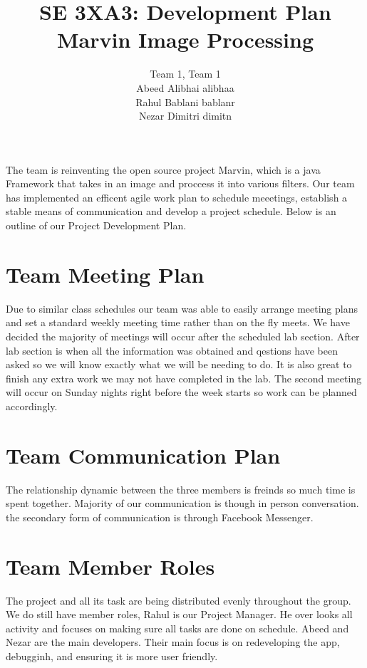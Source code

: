 \documentclass{article}
\begin{document}
\title{SE 3XA3: Development Plan \\ Marvin Image Processing}
\maketitle
\begin{center}
\author{Team 1, Team 1\\Abeed Alibhai alibhaa\\Rahul Bablani bablanr\\Nezar Dimitri dimitn}
\end{center}
The team is reinventing the open source project Marvin, which is a java Framework that takes in an image and proccess it into various filters. Our team has implemented an efficent agile work plan to schedule meeetings, establish a stable means of communication and  develop a project schedule. Below is an outline of our Project Development Plan.

\section{Team Meeting Plan}
Due to similar class schedules our team was able to easily arrange meeting plans and set a standard weekly meeting time rather than on the fly meets. We have decided the majority of meetings will occur after the scheduled lab section. After lab section is when all the information was obtained and qestions have been asked so we will know exactly what we will be needing to do. It is also great to finish any extra work we may not have completed in the lab. The second meeting will occur on Sunday nights right before the week starts so work can be planned accordingly.

\section{Team Communication Plan}
The relationship dynamic between the three members is freinds so much time is spent together. Majority of our communication is though in person conversation. the secondary form of communication is through Facebook Messenger.

\section{Team Member Roles}
The project and all its task are being distributed evenly throughout the group. We do still have member roles, Rahul is our Project Manager. He over looks all activity and focuses on making sure all tasks are done on schedule. Abeed and Nezar are the main developers. Their main focus is on redeveloping the app, debugginh,  and ensuring it is more user friendly.
\end{document}
